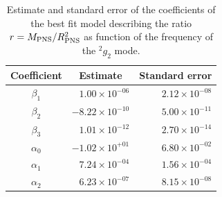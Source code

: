 


\begin{table}[h]

  \begin{tabular}{crr}
    \hline
    Coefficient & \multicolumn{1}{c}{Estimate} & Standard error \\
    \hline
   $\beta_1$  &  $ 1.00 \times 10^{-06}$ & $2.12 \times 10^{-08}$ \\   
   $\beta_2$  &  $-8.22 \times 10^{-10}$ & $5.00 \times 10^{-11}$ \\
   $\beta_3$  &  $ 1.01 \times 10^{-12}$ & $2.70 \times 10^{-14}$ \\
   $\alpha_0$ &  $-1.02 \times 10^{+01}$ & $6.80 \times 10^{-02}$ \\
   $\alpha_1$ &  $ 7.24 \times 10^{-04}$ & $1.56 \times 10^{-04}$ \\
   $\alpha_2$ &  $ 6.23 \times 10^{-07}$ & $8.15 \times 10^{-08}$ \\   
    \hline
  \end{tabular}
\caption{Estimate and standard error of the coefficients of the best fit model describing the ratio $r=M_{\rm PNS}/R_{\rm PNS}^2$ as function of the frequency of the $\mbox{}^2g_2$ mode.}\label{tab:model}
\end{table}



